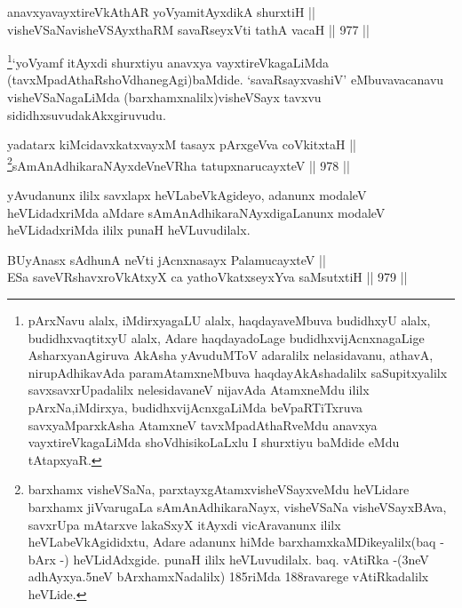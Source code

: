
\begin{shl}
anavxyavayxtireVkAthAR yoV\s yamitAyxdikA shurxtiH || \\
visheVSaNavisheVSAyxthaRM savaRseyxVti tathA vacaH \hfill || 977 ||  
\end{shl}

\begin{artha}
\footnote{pArxNavu alalx, iMdirxyagaLU alalx, haqdayaveMbuva budidhxyU alalx, budidhxvaqtitxyU alalx, Adare haqdayadoLage budidhxvijAcnxnagaLige AsharxyanAgiruva AkAsha yAvuduMToV adaralilx nelasidavanu, athavA, nirupAdhikavAda paramAtamxneMbuva haqdayAkAshadalilx saSupitxyalilx savxsavxrUpadalilx nelesidavaneV nijavAda AtamxneMdu ililx pArxNa,iMdirxya, budidhxvijAcnxgaLiMda beVpaRTiTxruva savxyaMparxkAsha AtamxneV tavxMpadAthaRveMdu anavxya vayxtireVkagaLiMda shoVdhisikoLaLxlu I shurxtiyu baMdide eMdu tAtapxyaR.}`yoV\s yamf  itAyxdi shurxtiyu anavxya vayxtireVkagaLiMda (tavxMpadAthaRshoVdhanegAgi)baMdide. `savaRsayxvashiV' eMbuva\break vacanavu visheVSaNagaLiMda (barxhamxnalilx)visheVSayx tavxvu sididhxsuvudakAkxgi\-ruvudu.
\end{artha}

\begin{shl}
yadatarx kiMcidavxkatxvayxM tasayx pArxgeVva coVkitxtaH || \\
\footnote{barxhamx visheVSaNa, parxtayxgAtamxvisheVSayxveMdu heVLidare barxhamx jiVvarugaLa sAmAnAdhikaraNayx, visheVSaNa visheVSayxBAva, savxrUpa mAtarxve lakaSxyX itAyxdi vicAravanunx ililx heVLabeVkAgididxtu, Adare adanunx hiMde barxhamxkaMDikeyalilx(baq - bArx -) heVLidAdxgide. punaH ililx heVLuvudilalx. baq. vAtiRka -(3neV adhAyxya.5neV bArxhamxNadalilx) 185riMda 188ravarege vAtiRkadalilx heVLide.}sAmAnAdhikaraNAyxdeVneVRha tatupxnarucayxteV \hfill || 978 ||  
\end{shl}


\begin{artha}
yAvudanunx ililx savxlapx heVLabeVkAgideyo, adanunx modaleV heVLidadxriMda aMdare sAmAnAdhikaraNAyxdigaLanunx modaleV heVLidadxriMda ililx punaH heVLuvudilalx.
\end{artha}


\begin{shl}
BUyAnasx sAdhunA neVti jAcnxnasayx PalamucayxteV || \\
ESa saveVRshavxroVkAtxyX ca yathoVkatxseyxYva saMsutxtiH \hfill || 979 ||  
\end{shl}

